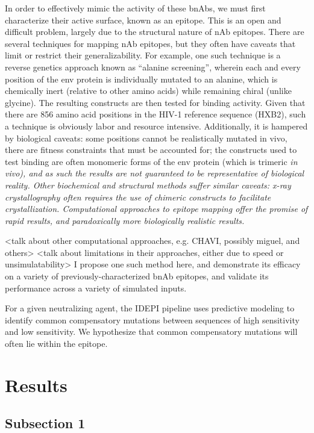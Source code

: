 \documentclass[10pt]{article}
\begin{document}
In order to effectively mimic the activity of these bnAbs,
we must first characterize their active surface, known as an epitope.
This is an open and difficult problem, largely due to the structural nature of nAb epitopes.
There are several techniques for mapping nAb epitopes, but they often have caveats that limit or restrict their generalizability.
For example, one such technique is a reverse genetics approach known as “alanine screening”,
wherein each and every position of the env protein is individually mutated to an alanine,
which is chemically inert (relative to other amino acids) while remaining chiral (unlike glycine).
The resulting constructs are then tested for binding activity.
Given that there are 856 amino acid positions in the HIV-1 reference sequence ({HXB2}),
such a technique is obviously labor and resource intensive.
Additionally, it is hampered by biological caveats: some positions cannot be realistically mutated in vivo,
there are fitness constraints that must be accounted for;
the constructs used to test binding are often monomeric forms of the env protein (which is trimeric \em{in vivo}),
and as such the results are not guaranteed to be representative of biological reality.
Other biochemical and structural methods suffer similar caveats:
x-ray crystallography often requires the use of chimeric constructs to facilitate crystallization.
Computational approaches to epitope mapping offer the promise of rapid results,
and paradoxically more biologically realistic results.

<talk about other computational approaches, e.g. CHAVI, possibly miguel, and others>
<talk about limitations in their approaches, either due to speed or unsimulatability> I propose one such method here, and demonstrate its efficacy on a variety of previously-characterized bnAb epitopes, and validate its performance across a variety of simulated inputs.

For a given neutralizing agent,
the IDEPI pipeline uses predictive modeling to identify common compensatory mutations between sequences of high sensitivity and low sensitivity.
We hypothesize that common compensatory mutations will often lie within the epitope.

\section*{Results}

\subsection*{Subsection 1}
\end{document}
